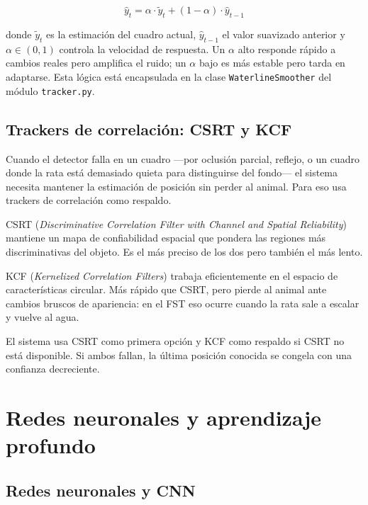 \begin{equation}
    \hat{y}_t = \alpha \cdot \tilde{y}_t + (1 - \alpha) \cdot \hat{y}_{t-1}
    \label{eq:ema}
\end{equation}

donde $\tilde{y}_t$ es la estimación del cuadro actual, $\hat{y}_{t-1}$ el valor
suavizado anterior y $\alpha \in (0,1)$ controla la velocidad de respuesta. Un $\alpha$
alto responde rápido a cambios reales pero amplifica el ruido; un $\alpha$ bajo es más
estable pero tarda en adaptarse. Esta lógica está encapsulada en la clase
\texttt{WaterlineSmoother} del módulo \texttt{tracker.py}.

\subsection{Trackers de correlación: CSRT y KCF}

Cuando el detector falla en un cuadro ---por oclusión parcial, reflejo, o un cuadro
donde la rata está demasiado quieta para distinguirse del fondo--- el sistema necesita
mantener la estimación de posición sin perder al animal. Para eso usa trackers de
correlación como respaldo.

CSRT (\textit{Discriminative Correlation Filter with Channel and Spatial Reliability})
\cite{lukezic2017} mantiene un mapa de confiabilidad espacial que pondera las regiones
más discriminativas del objeto. Es el más preciso de los dos pero también el más lento.

KCF (\textit{Kernelized Correlation Filters}) \cite{henriques2015} trabaja eficientemente
en el espacio de características circular. Más rápido que CSRT, pero pierde al animal
ante cambios bruscos de apariencia: en el FST eso ocurre cuando la rata sale a escalar
y vuelve al agua.

El sistema usa CSRT como primera opción y KCF como respaldo si CSRT no está disponible.
Si ambos fallan, la última posición conocida se congela con una confianza decreciente.

\section{Redes neuronales y aprendizaje profundo}

\subsection{Redes neuronales y CNN}

